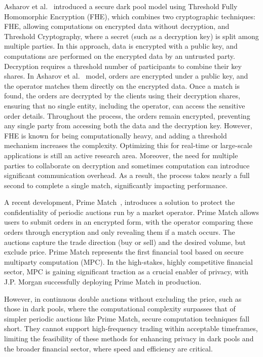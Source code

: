Asharov et al.~\cite{AsharovBPV20} introduced a secure dark pool model using Threshold Fully Homomorphic Encryption (FHE), which combines two cryptographic techniques: FHE, allowing computations on encrypted data without decryption, and Threshold Cryptography, where a secret (such as a decryption key) is split among multiple parties. In this approach, data is encrypted with a public key, and computations are performed on the encrypted data by an untrusted party. Decryption requires a threshold number of participants to combine their key shares. In Asharov et al.~\cite{AsharovBPV20} model, orders are encrypted under a public key, and the operator matches them directly on the encrypted data. Once a match is found, the orders are decrypted by the clients using their decryption shares, ensuring that no single entity, including the operator, can access the sensitive order details. Throughout the process, the orders remain encrypted, preventing any single party from accessing both the data and the decryption key. However, FHE is known for being computationally heavy, and adding a threshold mechanism increases the complexity. Optimizing this for real-time or large-scale applications is still an active research area. Moreover, the need for multiple parties to collaborate on decryption and sometimes computation can introduce significant communication overhead. As a result, the process takes nearly a full second to complete a single match, significantly impacting performance.

A recent development, Prime Match~\cite{polychroniadou2023prime}, introduces a solution to protect the confidentiality of periodic auctions run by a market operator. Prime Match allows users to submit orders in an encrypted form, with the operator comparing these orders through encryption and only revealing them if a match occurs. The auctions capture the trade direction (buy or sell) and the desired volume, but exclude price. Prime Match represents the first financial tool based on secure multiparty computation (MPC). In the high-stakes, highly competitive financial sector, MPC is gaining significant traction as a crucial enabler of privacy, with J.P. Morgan successfully deploying Prime Match in production.


However, in continuous double auctions without excluding the price, such as those in dark pools, where the computational complexity surpasses that of simpler periodic auctions like Prime Match, secure computation techniques fall short. They cannot support high-frequency trading within acceptable timeframes, limiting the feasibility of these methods for enhancing privacy in dark pools and the broader financial sector, where speed and efficiency are critical.

